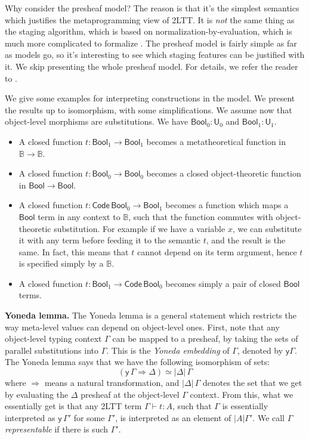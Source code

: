 \documentclass[11pt,a4paper,twoside]{article}
\newcommand{\msf}[1]{\mathsf{#1}}
\newcommand{\U}{\mathsf{U}}
\newcommand{\Code}{\mathsf{Code}}
\newcommand{\Bool}{\msf{Bool}}
\begin{document}
Why consider the presheaf model?  The reason is that it's the simplest semantics
which justifies the metaprogramming view of 2LTT. It is \emph{not} the same
thing as the staging algorithm, which is based on normalization-by-evaluation,
which is much more complicated to formalize \cite{bocquet2021induction}. The
presheaf model is fairly simple as far as models go, so it's interesting to see
which staging features can be justified with it. We skip presenting the whole
presheaf model. For details, we refer the reader to
\cite[Section~1.2]{huber-thesis}.

We give some examples for interpreting constructions in the model. We present the
results up to isomorphism, with some simplifications. We assume now that
object-level morphisms are substitutions. We have $\Bool_0 : \U_0$ and $\Bool_1
: \U_1$.
\begin{itemize}
  \item A closed function $t : \Bool_1 \to \Bool_1$ becomes a metatheoretical
    function in $\mathbb{B} \to \mathbb{B}$.
  \item A closed function $t : \Bool_0 \to \Bool_0$ becomes a closed object-theoretic
    function in $\Bool \to \Bool$.
  \item A closed function $t : \Code\,\Bool_0 \to \Bool_1$ becomes a function
    which maps a $\Bool$ term in any context to $\mathbb{B}$, such that the
    function commutes with object-theoretic substitution. For example if we have
    a variable $x$, we can substitute it with any term before feeding it to the
    semantic $t$, and the result is the same. In fact, this means that $t$
    cannot depend on its term argument, hence $t$ is specified simply by a
    $\mathbb{B}$.
  \item
    A closed function $t : \Bool_1 \to \Code\,\Bool_0$ becomes simply a pair of
    closed $\Bool$ terms.
\end{itemize}
\noindent\textbf{Yoneda lemma.} The Yoneda lemma is a general statement which
restricts the way meta-level values can depend on object-level ones. First, note that any
object-level typing context $\Gamma$ can be mapped to a presheaf, by taking the
sets of parallel substitutions into $\Gamma$. This is the \emph{Yoneda
embedding} of $\Gamma$, denoted by $\msf{y}\Gamma$. The Yoneda lemma says
that we have the following isomorphism of sets:
\[
   (\msf{y}\,\Gamma \Rightarrow \Delta) \simeq |\Delta|\,\Gamma
\]
where $\Rightarrow$ means a natural transformation, and $|\Delta|\,\Gamma$
denotes the set that we get by evaluating the $\Delta$ presheaf at the
object-level $\Gamma$ context. From this, what we essentially get is that any
2LTT term $\Gamma \vdash t : A$, such that $\Gamma$ is essentially interpreted
as $\msf{y}\,\Gamma'$ for some $\Gamma'$, is interpreted as an element of
$|A|\Gamma'$. We call $\Gamma$ \emph{representable} if there is such $\Gamma'$.
\end{document}
